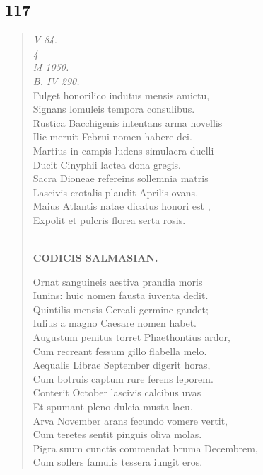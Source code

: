 \documentclass[11pt, a4paper]{report}
\begin{document}
            \subsection*{117}
      \begin{verse}
      \textit{V 84.} \\ \textit{4} \\ \textit{M 1050.} \\ \textit{B. IV 290.} \\ Fulget honorilico indutus mensis amictu, \\ Signans lomuleis tempora consulibus. \\ Rustica Bacchigenis intentans arma novellis \\ Ilic meruit Februi nomen habere dei. \\ Martius in campis ludens simulacra duelli \\ Ducit Cinyphii lactea dona gregis. \\ Sacra Dioneae refereins sollemnia matris \\ Lascivis crotalis plaudit Aprilis ovans. \\ Maius Atlantis natae dicatus honori  \lbrack est \rbrack , \\ Expolit et pulcris florea serta rosis. \\ 
        ﻿\pagebreak 
    \begin{center} \textbf{CODICIS SALMASIAN.} \end{center}Ornat sanguineis aestiva prandia moris \\ Iunins: huic nomen fausta iuventa dedit. \\ Quintilis mensis Cereali germine gaudet; \\ Iulius a magno Caesare nomen habet. \\ Augustum penitus torret Phaethontius ardor, \\ Cum recreant fessum gillo flabella melo. \\ Aequalis Librae September digerit horas, \\ Cum botruis captum rure ferens leporem. \\ Conterit October lascivis calcibus uvas \\ Et spumant pleno dulcia musta lacu. \\ Arva November arans fecundo vomere vertit, \\ Cum teretes sentit pinguis oliva molas. \\ Pigra suum cunctis commendat bruma Decembrem, \\ Cum sollers famulis tessera iungit eros. \\ 
      \end{verse}
  
\end{document}
